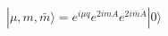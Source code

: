 \begin{equation}
|\mu,m,\bar{m}\rangle = e^{i\mu q} e^{2imA} e^{2i\bar{m}\bar{A}} |0\rangle
\end{equation}

